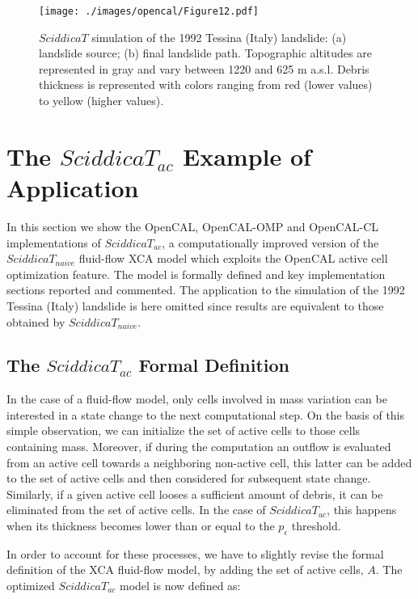 \begin{figure}
	\begin{center}
		\texttt{[image: ./images/opencal/Figure12.pdf]}
		\caption[$SciddicaT$ simulation of the 1992 Tessina (Italy) landslide.]{$SciddicaT$ simulation of the 1992 Tessina (Italy) landslide: (a) landslide source; (b) final landslide path. Topographic altitudes are represented in gray and vary between 1220 and 625 m a.s.l. Debris
		thickness is represented with colors ranging from red (lower values)
		to yellow (higher values).}
		\label{fig:sciddicaT-simulation}
	\end{center}
\end{figure}

\section{The $SciddicaT_{ac}$ Example of Application}
\label{sec:SciddicaT-ac}

In this section we show the OpenCAL, OpenCAL-OMP and OpenCAL-CL
implementations of $SciddicaT_{ac}$, a computationally improved
version of the $SciddicaT_{naive}$ fluid-flow XCA model which
exploits the OpenCAL active cell optimization feature. The model is
formally defined and key implementation sections reported and
commented. The application to the simulation of the 1992 Tessina
(Italy) landslide is here omitted since results are equivalent to
those obtained by $SciddicaT_{naive}$.

\subsection{The $SciddicaT_{ac}$ Formal Definition}
In the case of a fluid-flow model, only cells involved in mass
variation can be interested in a state change to the next
computational step. On the basis of this simple observation, we
can initialize the set of active cells to those cells containing
mass. Moreover, if during the computation an outflow is evaluated
from an active cell towards a neighboring non-active cell, this
latter can be added to the set of active cells and then considered
for subsequent state change. Similarly, if a given active cell
looses a sufficient amount of debris, it can be eliminated from
the set of active cells. In the case of $SciddicaT_{ac}$, this
happens when its thickness becomes lower than or equal to the
$p_\epsilon$ threshold.

In order to account for these processes, we have to slightly
revise the formal definition of the XCA fluid-flow model, by
adding the set of active cells, $A$. The optimized
$SciddicaT_{ac}$ model is now defined as:

